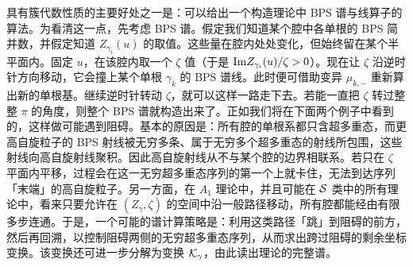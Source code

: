 具有簇代数性质的主要好处之一是：可以给出一个构造理论中 BPS 谱与线算子的算法。为看清这一点，先考虑 BPS 谱。假定我们知道某个腔中各单根的 BPS 简并数，并假定知道 $Z_{\gamma_i}(u)$ 的取值。这些量在腔内处处变化，但始终留在某个半平面内。固定 $u$，在该腔内取一个 $\zeta$ 值（于是 ${\rm Im}Z_{\gamma_i}(u)/\zeta >0$）。现在让 $\zeta$ 沿逆时针方向移动，它会撞上某个单根 $\gamma_k$ 的 BPS 谱线。此时便可借助变异 $\mu_{k,-}$ 重新算出新的单根基。继续逆时针转动 $\zeta$，就可以这样一路走下去。若能一直把 $\zeta$ 转过整整 $\pi$ 的角度，则整个 BPS 谱就构造出来了。正如我们将在下面两个例子中看到的，这样做可能遇到阻碍。基本的原因是：所有腔的单根系都只含超多重态，而更高自旋粒子的 BPS 射线被无穷多条、属于无穷多个超多重态的射线所包围，这些射线向高自旋射线聚积。因此高自旋射线从不与某个腔的边界相联系。若只在 $\zeta$ 平面内平移，过程会在这一无穷超多重态序列的第一个上就卡住，无法到达序列「末端」的高自旋粒子。另一方面，在 $A_1$ 理论中，并且可能在 $\mathcal{S}$ 类中的所有理论中，看来只要允许在 $(Z_\gamma, \zeta)$ 的空间中沿一般路径移动，所有腔都能经由有限多步连通。于是，一个可能的谱计算策略是：利用这类路径「跳」到阻碍的前方，然后再回溯，以控制阻碍两侧的无穷超多重态序列，从而求出跨过阻碍的剩余坐标变换。该变换还可进一步分解为变换 $\mathcal{K}_\gamma$，由此读出理论的完整谱。

